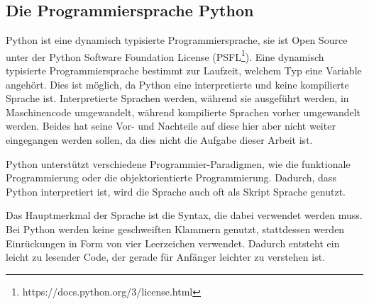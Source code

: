\subsection{Die Programmiersprache Python}\label{einleitung:python}

Python ist eine dynamisch typisierte Programmiersprache, sie ist Open Source
unter der Python Software Foundation License
(PSFL\footnote{https://docs.python.org/3/license.html}). Eine dynamisch
typisierte Programmiersprache bestimmt zur Laufzeit, welchem Typ eine Variable
angehört. Dies ist möglich, da Python eine interpretierte und keine kompilierte
Sprache ist. Interpretierte Sprachen werden, während sie ausgeführt werden, in
Maschinencode umgewandelt, während kompilierte Sprachen vorher umgewandelt
werden. Beides hat seine Vor- und Nachteile auf diese hier aber nicht weiter
eingegangen werden sollen, da dies nicht die Aufgabe dieser Arbeit ist.

Python unterstützt verschiedene Programmier-Paradigmen, wie die funktionale
Programmierung oder die objektorientierte Programmierung. Dadurch, dass Python
interpretiert ist, wird die Sprache auch oft als Skript Sprache genutzt.

Das Hauptmerkmal der Sprache ist die Syntax, die dabei verwendet werden muss. 
Bei Python werden keine geschweiften Klammern genutzt, stattdessen werden 
Einrückungen in Form von vier Leerzeichen verwendet. Dadurch entsteht ein 
leicht zu lesender Code, der gerade für Anfänger leichter zu verstehen ist.
